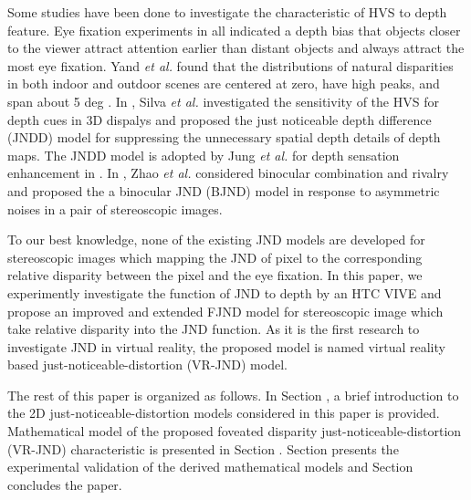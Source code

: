 \documentclass[journal]{IEEEtran}
\begin{document}
Some studies have been done to investigate the characteristic of HVS to depth feature. Eye fixation experiments in \cite{RN150,RN138,RN148} all indicated a depth bias that objects closer to the viewer attract attention earlier than distant objects and always attract the most eye fixation. Yand \textit{et al.} found that the distributions of natural disparities in both indoor and outdoor scenes are centered at zero, have high peaks, and span about 5 deg \cite{RN607}. In \cite{RN641, RN644}, Silva \textit{et al.} investigated the sensitivity of the HVS for depth cues in 3D dispalys and proposed the just noticeable depth difference (JNDD) model for suppressing the unnecessary spatial depth details of depth maps. The JNDD model is adopted by Jung \textit{et al.} for depth sensation enhancement in \cite{RN643,RN640}. In \cite{RN637}, Zhao \textit{et al.} considered binocular combination and rivalry and proposed the a binocular JND (BJND) model in response to asymmetric noises in a pair of stereoscopic images.

To our best knowledge, none of the existing JND models are developed for stereoscopic images which mapping the JND of pixel to the corresponding relative disparity between the pixel and the eye fixation. In this paper, we experimently investigate the function of JND to depth by an HTC VIVE and propose an improved and extended FJND model for stereoscopic image which take relative disparity into the JND function. As it is the first research to investigate JND in virtual reality, the proposed model is named virtual reality based just-noticeable-distortion (VR-JND) model.

The rest of this paper is organized as follows. In Section \uppercase\expandafter{}, a brief introduction to the 2D just-noticeable-distortion models considered in this paper is provided. Mathematical model of the proposed foveated disparity just-noticeable-distortion (VR-JND) characteristic is presented in Section \uppercase\expandafter{}. Section \uppercase\expandafter{} presents the experimental validation of the derived mathematical models and Section \uppercase\expandafter{} concludes the paper.
\end{document}

